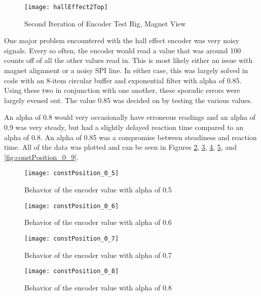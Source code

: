 \begin{figure}[H]
	\centering
	\texttt{[image: hallEffect2Top]}
	\caption{Second Iteration of Encoder Test Rig, Magnet View}
	\label{fig:Second Iteration of Encoder Test Rig, Magnet View}
\end{figure}

\noindent One major problem encountered with the hall effect encoder was very noisy signals. Every so often, the encoder would read a value that was around 100 counts off of all the other values read in. This is most likely either an issue with magnet alignment or a noisy SPI line. In either case, this was largely solved in code with an 8-item circular buffer and exponential filter with alpha of 0.85. Using these two in conjunction with one another, these sporadic errors were largely evened out. The value 0.85 was decided on by testing the various values. 

\noindent An alpha of 0.8 would very occasionally have erroneous readings and an alpha of 0.9 was very steady, but had a slightly delayed reaction time compared to an alpha of 0.8. An alpha of 0.85 was a compromise between steadiness and reaction time. All of the data was plotted and can be seen in Figures \ref{fig:constPosition_0_5}, \ref{fig:constPosition_0_6}, \ref{fig:constPosition_0_7}, \ref{fig:constPosition_0_8}, and \ref{fig:constPosition_0_9}.

\begin{figure}[H]
	\centering
	\texttt{[image: constPosition\_0\_5]}
	\caption{Behavior of the encoder value with alpha of 0.5}
	\label{fig:constPosition_0_5}
\end{figure}

\begin{figure}[H]
\centering
\texttt{[image: constPosition\_0\_6]}
\caption{Behavior of the encoder value with alpha of 0.6}
\label{fig:constPosition_0_6}
\end{figure}

\begin{figure}[H]
\centering
\texttt{[image: constPosition\_0\_7]}
\caption{Behavior of the encoder value with alpha of 0.7}
\label{fig:constPosition_0_7}
\end{figure}

\begin{figure}[H]
\centering
\texttt{[image: constPosition\_0\_8]}
\caption{Behavior of the encoder value with alpha of 0.8}
\label{fig:constPosition_0_8}
\end{figure}

